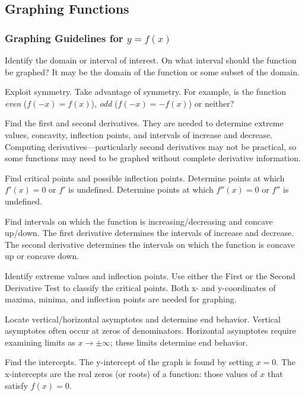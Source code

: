 %
%
%

\subsection{Graphing Functions}
\subsubsection{Graphing Guidelines for $y = f(x)$}
\begin{enumdescript}
    \item[Identify the domain or interval of interest.] On what interval should the function be graphed? It may be the domain of the function or some subset of the domain.

    \item[Exploit symmetry.] Take advantage of symmetry. For example, is the function \textit{even} ($f(-x) = f(x)$), \textit{odd} ($f(-x) = -f(x)$) or neither?

    \item[Find the first and second derivatives.] They are needed to determine extreme values, concavity, inflection points, and intervals of increase and decrease. Computing derivatives—particularly second derivatives may not be practical, so some functions may need to be graphed without complete derivative information.

    \item[Find critical points and possible inflection points.] Determine points at which $f'(x) = 0$ or $f'$ is undefined. Determine points at which $f''(x) = 0$ or $f''$   is undefined.

    \item[Find intervals on which the function is increasing/decreasing and concave up/down.] The first derivative determines the intervals of increase and decrease. The second derivative determines the intervals on which the function is concave up or concave down.

    \item[Identify extreme values and inflection points.] Use either the First or the Second Derivative Test to classify the critical points. Both x- and y-coordinates of maxima, minima, and inflection points are needed for graphing.

    \item[Locate vertical/horizontal asymptotes and determine end behavior.] Vertical asymptotes often occur at zeros of denominators. Horizontal asymptotes require examining limits as $x \rightarrow \pm \infty$; these limits determine end behavior.

    \item[Find the intercepts.] The y-intercept of the graph is found by setting $x = 0$. The x-intercepts are the real zeros (or roots) of a function: those values of $x$ that satisfy $f(x) = 0$.
\end{enumdescript}
